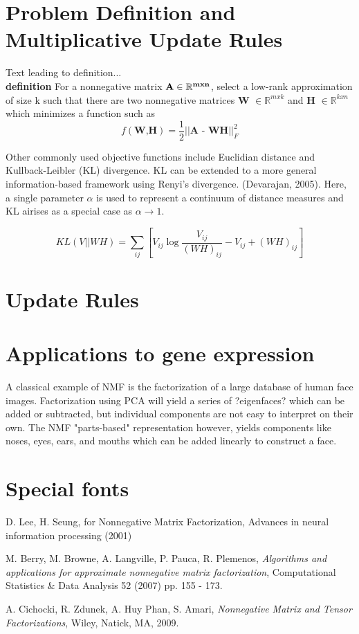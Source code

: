 \documentclass[final,leqno,onefignum,onetabnum]{siamltex1213}
\begin{document}
\section{Problem Definition and Multiplicative Update Rules}

Text leading to definition... \\

\textbf{definition} For a nonnegative matrix $\bf{A} \in \mathbb{R}^{m x n} $, select a low-rank approximation of size k such that there are two nonnegative matrices \textbf{W} $ \in \mathbb{R}^{m x k}$ and \textbf{H} $ \in \mathbb{R}^{k x n}$ which minimizes a function such as 
$$ f( \textbf{W,H}) = \frac{1}{2} || \textbf{A - WH} || ^{2}_{F}$$


Other commonly used objective functions include Euclidian distance and Kullback-Leibler (KL) divergence. KL can be extended to a more general information-based framework using Renyi's divergence. (Devarajan, 2005). Here, a single parameter $\alpha$ is used to represent a continuum of distance measures and KL airises as a special case as $\alpha \to 1$. 

$$ KL(V || WH) = \sum_{ij}{[V_{ij} \log{ \frac{V_{ij}}{(WH)_{ij}} - V_{ij} + (WH)_{ij}} ]} $$



\section{Update Rules}

\section{Applications to gene expression}
A classical example of NMF is the factorization of a large database of human face images. Factorization using PCA will yield a series of ?eigenfaces? which can be added or subtracted, but individual components are not easy to interpret on their own. The NMF "parts-based" representation however, yields components like noses, eyes, ears, and mouths which can be added linearly to construct a face. 

\section{Special fonts}


\begin{thebibliography}{1}



 {\sc D. Lee, H. Seung},
{\emAlgorithms for Nonnegative Matrix Factorization}, Advances in neural information processing (2001)

 {\sc M. Berry, M. Browne, A. Langville, P. Pauca, R. Plemenos},
{\em Algorithms and applications for approximate nonnegative matrix factorization}, Computational Statistics & Data Analysis 52 (2007) pp. 155 - 173.

 {\sc A. Cichocki, R. Zdunek, A. Huy Phan, S. Amari}, {\em Nonnegative Matrix and Tensor Factorizations}, Wiley, Natick, MA, 2009.

\end{thebibliography}
\end{document}
